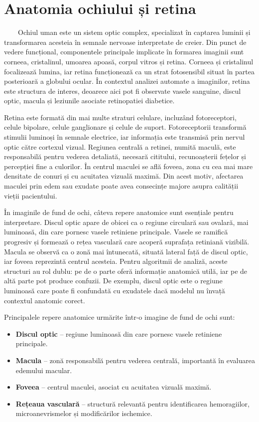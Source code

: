 \documentclass[12pt, a4paper, oneside, romanian]{teza-upb}
\begin{document}
\section{Anatomia ochiului și retina}

\ \ \ \ Ochiul uman este un sistem optic complex, specializat în captarea luminii și transformarea acesteia în semnale nervoase interpretate de creier. Din punct de vedere funcțional, componentele principale implicate în formarea imaginii sunt corneea, cristalinul, umoarea apoasă, corpul vitros și retina. Corneea și cristalinul focalizează lumina, iar retina funcționează ca un strat fotosensibil situat în partea posterioară a globului ocular. În contextul analizei automate a imaginilor, retina este structura de interes, deoarece aici pot fi observate vasele sanguine, discul optic, macula și leziunile asociate retinopatiei diabetice.
\bigskip

Retina este formată din mai multe straturi celulare, incluzând fotoreceptori, celule bipolare, celule ganglionare și celule de suport. Fotoreceptorii transformă stimulii luminoși în semnale electrice, iar informația este transmisă prin nervul optic către cortexul vizual. Regiunea centrală a retinei, numită maculă, este responsabilă pentru vederea detaliată, necesară cititului, recunoașterii fețelor și percepției fine a culorilor. În centrul maculei se află foveea, zona cu cea mai mare densitate de conuri și cu acuitatea vizuală maximă. Din acest motiv, afectarea maculei prin edem sau exudate poate avea consecințe majore asupra calității vieții pacientului.
\bigskip

În imaginile de fund de ochi, câteva repere anatomice sunt esențiale pentru interpretare. Discul optic apare de obicei ca o regiune circulară sau ovalară, mai luminoasă, din care pornesc vasele retiniene principale. Vasele se ramifică progresiv și formează o rețea vasculară care acoperă suprafața retiniană vizibilă. Macula se observă ca o zonă mai întunecată, situată lateral față de discul optic, iar foveea reprezintă centrul acesteia. Pentru algoritmii de analiză, aceste structuri au rol dublu: pe de o parte oferă informație anatomică utilă, iar pe de altă parte pot produce confuzii. De exemplu, discul optic este o regiune luminoasă care poate fi confundată cu exudatele dacă modelul nu învață contextul anatomic corect.
\bigskip

Principalele repere anatomice urmărite într-o imagine de fund de ochi sunt:

\begin{itemize}
  \item \textbf{Discul optic} -- regiune luminoasă din care pornesc vasele retiniene principale.
  \item \textbf{Macula} -- zonă responsabilă pentru vederea centrală, importantă în evaluarea edemului macular.
  \item \textbf{Foveea} -- centrul maculei, asociat cu acuitatea vizuală maximă.
  \item \textbf{Rețeaua vasculară} -- structură relevantă pentru identificarea hemoragiilor, microanevrismelor și modificărilor ischemice.
\end{itemize}
\end{document}
